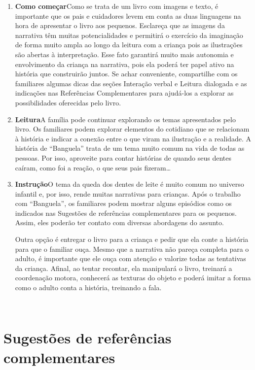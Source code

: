 \documentclass[11pt]{extarticle}
\begin{document}
\begin{enumerate}
\item \textbf{Como começar}\quad Como se trata de um livro com imagens e texto,
é importante que os pais e cuidadores levem em conta as duas linguagens 
na hora de apresentar o livro aos pequenos. Esclareça que as imagens da narrativa 
têm muitas potencialidades e permitirá o exercício da imaginação 
de forma muito ampla ao longo da leitura com a criança pois as ilustrações são 
abertas à interpretação. Esse fato garantirá muito mais autonomia e 
envolvimento da criança na narrativa, pois ela poderá ter papel ativo na 
história que construirão juntos. Se achar conveniente, compartilhe com 
os familiares algumas dicas das seções Interação verbal 
e Leitura dialogada e as indicações nas Referências Complementares 
para ajudá-los a explorar as possibilidades oferecidas pelo livro. 

\item \textbf{Leitura}\quad A família pode continuar 
explorando os temas apresentados pelo livro. Os familiares podem explorar 
elementos do cotidiano que se relacionam à história e indicar a conexão 
entre o que viram na ilustração e a realidade. A história de “Banguela” 
trata de um tema muito comum na vida de todas as pessoas. Por isso,
aproveite para contar histórias de quando seus dentes caíram, como foi a 
reação, o que seus pais fizeram\dots{}  

\item \textbf{Instrução}\quad O tema da queda dos dentes de leite 
é muito comum no universo infantil e, por isso, rende muitas 
narrativas para crianças. Após o trabalho com ``Banguela'', os familiares
podem mostrar alguns episódios como os indicados nas Sugestões de referências 
complementares para os pequenos. Assim, eles poderão ter contato com diversas
abordagens do assunto. 

Outra opção é entregar o livro para a criança e pedir que ela conte 
a história para que o familiar ouça. Mesmo que a narrativa não pareça 
completa para o adulto, é importante que ele ouça com atenção e 
valorize todas as tentativas da criança. Afinal, ao tentar recontar, 
ela manipulará o livro, treinará a coordenação motora, conhecerá as texturas 
do objeto e poderá imitar a forma como o adulto 
conta a história, treinando a fala. 
\end{enumerate}

 
\section{Sugestões de referências complementares}
\end{document}
